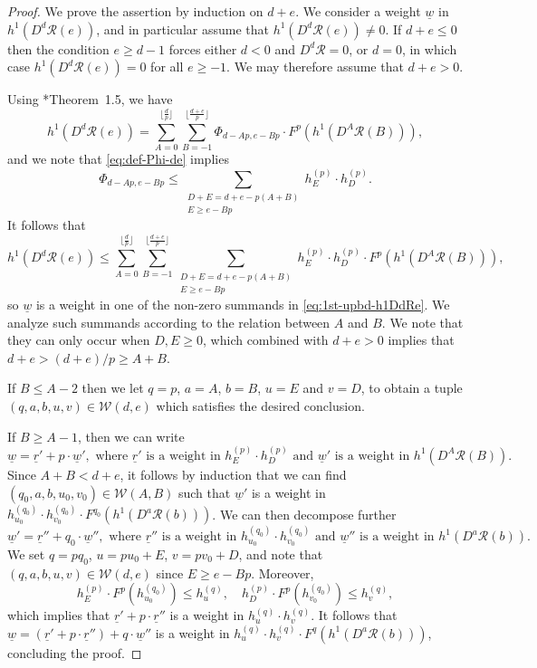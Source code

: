 \documentclass[11pt,reqno]{amsart}
\newcommand{\mc}[1]{\mathcal{#1}}
\newcommand{\ul}[1]{\underline{#1}}
\theoremstyle{definition}
\theoremstyle{remark}
\numberwithin{equation}{section}
\begin{document}
\begin{proof}
We prove the assertion by induction on $d+e$. We consider a weight $\ul{w}$ in $h^1(D^d\mc{R}(e))$, and in particular assume that $h^1(D^d\mc{R}(e))\neq 0$. If $d+e\leq 0$ then the condition $e\geq d-1$ forces either $d<0$ and $D^d\mc{R}=0$, or $d=0$, in which case $h^1(D^d\mc{R}(e))= 0$ for all $e\geq -1$. We may therefore assume that $d+e>0$.

Using \cite{KMRR}*{Theorem~1.5}, we have
\[ h^1(D^d\mc{R}(e)) = \sum_{A=0}^{\lfloor \frac{d}{p}\rfloor}\sum_{B=-1}^{\lfloor \frac{d+e}{p}\rfloor} \Phi_{d-Ap,e-Bp}\cdot F^p\left(h^1(D^A\mc{R}(B))\right),\]
and we note that \eqref{eq:def-Phi-de} implies 
\[\Phi_{d-Ap,e-Bp} \leq \sum_{\substack{D+E=d+e-p(A+B) \\ E\geq e-Bp}} h^{(p)}_E\cdot h^{(p)}_D.\]
It follows that
\begin{equation}\label{eq:1st-upbd-h1DdRe} h^1(D^d\mc{R}(e)) \leq \sum_{A=0}^{\lfloor \frac{d}{p}\rfloor}\sum_{B=-1}^{\lfloor \frac{d+e}{p}\rfloor}\sum_{\substack{D+E=d+e-p(A+B) \\ E\geq e-Bp}} h^{(p)}_E\cdot h^{(p)}_D \cdot F^p\left(h^1(D^A\mc{R}(B))\right),
\end{equation}
so $\ul{w}$ is a weight in one of the non-zero summands in \eqref{eq:1st-upbd-h1DdRe}. We analyze such summands according to the relation between $A$ and $B$. We note that they can only occur when $D,E\geq 0$, which combined with $d+e>0$ implies that $d+e>(d+e)/p\geq A+B$.

If $B\leq A-2$ then we let $q=p$, $a=A$, $b=B$, $u=E$ and $v=D$, to obtain a tuple $(q,a,b,u,v)\in\mc{W}(d,e)$ which satisfies the desired conclusion.

If $B\geq A-1$, then we can write \[\ul{w}=\ul{r}'+p\cdot\ul{w}',\text{ where $\ul{r}'$ is a weight in $h^{(p)}_E\cdot h^{(p)}_D$ and $\ul{w}'$ is a weight in $h^1(D^A\mc{R}(B))$.}\]
Since $A+B<d+e$, it follows by induction that we can find $(q_0,a,b,u_0,v_0)\in\mc{W}(A,B)$ such that $\ul{w}'$ is a weight in $h^{(q_0)}_{u_0}\cdot h^{(q_0)}_{v_0} \cdot F^{q_0}\left(h^1(D^a\mc{R}(b))\right)$. We can then decompose further
\[\ul{w}'=\ul{r}''+q_0\cdot\ul{w}'',\text{ where $\ul{r}''$ is a weight in $h^{(q_0)}_{u_0}\cdot h^{(q_0)}_{v_0}$ and $\ul{w}''$ is a weight in $h^1(D^a\mc{R}(b))$.}\]
We set $q=pq_0$, $u=pu_0+E$, $v=pv_0+D$, and note that $(q,a,b,u,v)\in\mc{W}(d,e)$ since $E\geq e-Bp$. Moreover,
\[ h^{(p)}_E\cdot F^p(h^{(q_0)}_{u_0}) \leq h^{(q)}_u,\quad h^{(p)}_D\cdot F^p(h^{(q_0)}_{v_0})\leq h^{(q)}_v,\]
which implies that $\ul{r}'+p\cdot\ul{r}''$ is a weight in $h^{(q)}_u\cdot h^{(q)}_v$. It follows that $\ul{w}=(\ul{r}'+p\cdot\ul{r}'')+q\cdot\ul{w}''$ is a weight in $h^{(q)}_u\cdot h^{(q)}_v \cdot F^q\left(h^1(D^a\mc{R}(b))\right)$, concluding the proof.
\end{proof}
\end{document}
